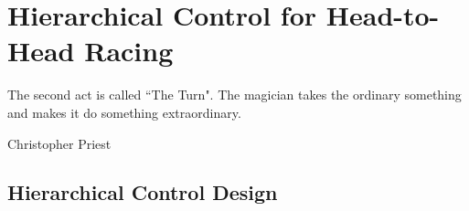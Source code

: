 \chapter{Hierarchical Control for Head-to-Head Racing} 
\epigraph{\flushright The second act is called ``The Turn". The magician takes the ordinary something and makes it do something extraordinary.}{Christopher Priest}
\label{chapter:hier}
\section{Hierarchical Control Design}
